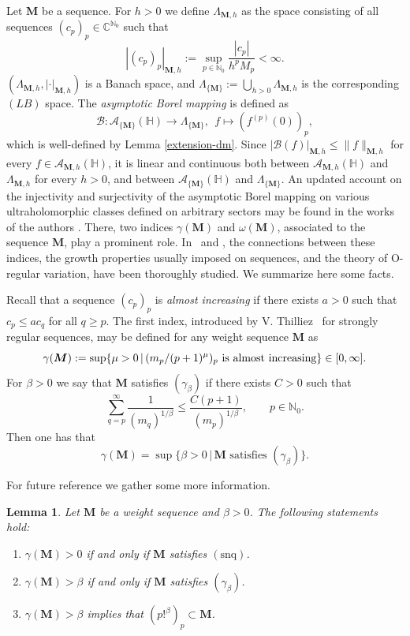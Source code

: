 \documentclass[12pt,a4paper]{article}
\newcommand{\N}{\mathbb{N}}
\newcommand{\C}{\mathbb{C}}
\newcommand{\HH}{\mathbb{H}}
\newcommand{\M}{{\boldsymbol{M}}}
\newcommand{\snq}{\operatorname{(snq)}}
\newcommand{\om}{\omega}
\newcommand{\ga}{\gamma}
\theoremstyle{plain}
\newtheorem{lemma}[theorem]{Lemma}
\theoremstyle{definition}
\numberwithin{equation}{section}
\begin{document}
Let $\M$ be a sequence. For $h>0$ we define $\Lambda_{\M,h}$  as the space consisting of all sequences $(c_p)_p \in \C^{\N_0}$ such that
$$
|(c_p)_p|_{\M,h}:=\sup_{p \in \N_0} \frac{|c_p|}{h^pM_p} < \infty.
$$
$(\Lambda_{\M,h},|\cdot|_{\M,h})$ is a Banach space, and  $\Lambda_{\{\M\}}:= \bigcup_{h > 0} \Lambda_{\M,h}$ is the corresponding $(LB)$ space. The \emph{asymptotic Borel mapping} is defined as
$$
\mathcal{B}: \mathcal{A}_{\{\M\}}(\HH) \rightarrow \Lambda_{\{\M\}},\ \  f \mapsto (f^{(p)}(0))_{p},
$$
which is well-defined by Lemma \ref{extension-dm}. Since $|\mathcal{B}(f)|_{\M,h}\le \|f\|_{\M,h}$ for every $f\in\mathcal{A}_{\M,h}(\HH)$, it is linear and continuous both between $\mathcal{A}_{\M,h}(\HH)$ and $\Lambda_{\M,h}$ for every $h>0$, and between $\mathcal{A}_{\{\M\}}(\HH)$ and $\Lambda_{\{\M\}}$.
An updated account on the injectivity and surjectivity of the asymptotic Borel mapping on various ultraholomorphic classes defined on arbitrary sectors may be found in the works of the authors \cite{JG-S-S,JimenezSanzSchindlSurjectDC,JimenezMiguelSanzSchindlOptFlat,JimenezMiguelSanzSchindlSurjectSM}. There, two indices $\ga(\M)$ and $\om(\M)$, associated to the sequence $\M$, play a prominent role.
In~\cite[Ch.~2]{PhDJimenez} and \cite[Sect.~3]{JimenezSanzSchindlIndex}, the connections between these indices, the growth properties usually imposed on  sequences, and the theory of O-regular variation, have been thoroughly studied. We summarize here some facts.

Recall that a sequence $(c_p)_{p}$ is \emph{almost increasing} if there exists $a>0$ such that $c_p\leq a c_q $ for all $ q\geq p$. The first index, introduced by V. Thilliez~\cite[Sect.\ 1.3]{Thilliez03} for strongly regular sequences, may be defined for any weight sequence $\M$ as
$$\ga(\M):=\sup\{\mu>0\, | \,(m_{p}/(p+1)^\mu)_{p}\hbox{ is almost increasing} \}\in[0,\infty].
$$
For  $\beta>0$ we say that $\M$  satisfies $(\ga_{\beta})$ if there exists $C>0$ such that
\begin{equation*}
\sum^\infty_{q=p} \frac{1}{(m_q)^{1/\beta}}\leq \frac{C (p+1) }{(m_p)^{1/\beta}},  \qquad p\in\N_0.
\end{equation*}
Then one has that
$$ \ga(\M)=\sup\{\beta>0  \, | \, \M \,\, \text{satisfies} \,\, (\ga_{\beta})  \}.$$

For future reference we gather some more information.
\begin{lemma}\label{lemma.PropertiesGammaIndex}
Let $\M$ be a weight sequence and $\beta>0$. The following statements hold:
\begin{enumerate}
 \item[(i)] $\ga(\M)>0$ if and only if $\M$ satisfies $\snq$.
 \item[(ii)] $\ga(\M)>\beta$ if and only if $\M$ satisfies $(\ga_\beta)$.
 \item[(iii)] $\ga(\M)>\beta$ implies that $(p!^{\beta})_p\subset\M$.
\end{enumerate}
\end{lemma}
\end{document}
